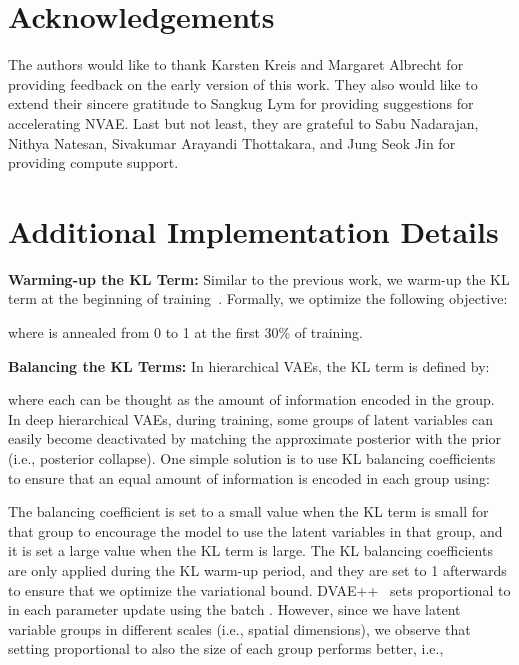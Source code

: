 \documentclass{article}
\begin{document}
\section*{Acknowledgements}
The authors would like to thank Karsten Kreis and Margaret Albrecht for providing feedback on the early version of this work. They also would like to extend their sincere gratitude to Sangkug Lym for providing suggestions for accelerating NVAE. Last but not least, they are grateful to Sabu Nadarajan, Nithya Natesan, Sivakumar Arayandi Thottakara, and Jung Seok Jin for providing compute support.
 

{\small
}


\clearpage
\appendix
\section{Additional Implementation Details}\label{app:imp_det}

\textbf{Warming-up the KL Term:} Similar to the previous work, we warm-up the KL term at the beginning of training~\cite{sonderby2016ladder}. Formally, we optimize the following objective:

where  is annealed from 0 to 1 at the first 30\% of training. 

\textbf{Balancing the KL Terms:} In hierarchical VAEs, the KL term is defined by:

where each  can be thought as the amount of information encoded in the  group. In deep hierarchical VAEs, during training, some groups of latent variables can easily become deactivated by matching the approximate posterior with the prior (i.e., posterior collapse). One simple solution is to use KL balancing coefficients \cite{Vahdat2018DVAE++, chen2016lossy} to ensure that an equal amount of information is encoded in each group using:

The balancing coefficient  is set to a small value when the KL term is small for that group to encourage the model to use the latent variables in that group, and it is set a large value when the KL term is large. The KL balancing coefficients are only applied during the KL warm-up period, and they are set to 1 afterwards to ensure that we optimize the variational bound. DVAE++~\cite{Vahdat2018DVAE++} sets  proportional to  in each parameter update using the batch . However, since we have latent variable groups in different scales (i.e., spatial dimensions), we observe that setting  proportional to also the size of each group performs better, i.e.,  
\end{document}
